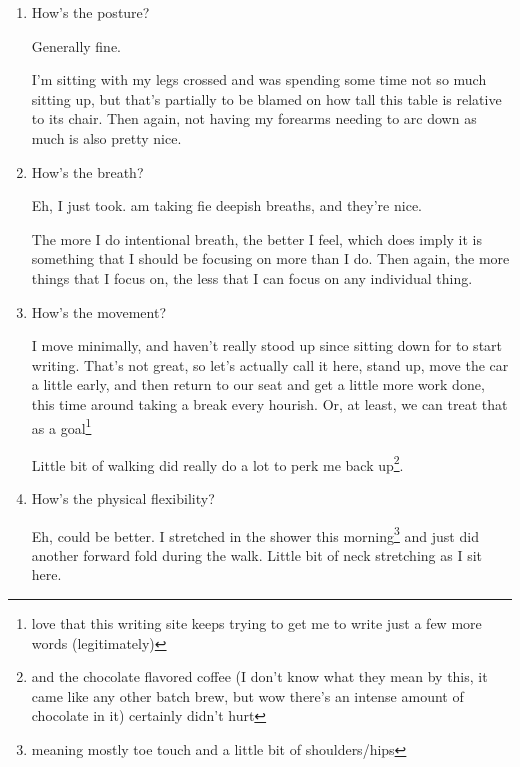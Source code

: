 \documentclass[12pt]{article}
\renewcommand{\,}{\textsuperscript{,}}
\begin{document}
\begin{enumerate}
One of the milks and the yogurt technically got consumed about two hours after the rest of the food, but who's keeping track?\footnote{me, as it turns out}

At the cafe, I've had a raspberry italian soda, but yesterday I got a sweet crepe here and it was delicious. I'm tempted to get another today, and might do on of their savory options.

\item How's the posture?

Generally fine.

I'm sitting with my legs crossed and was spending some time not so much sitting up, but that's partially to be blamed on how tall this table is relative to its chair.  
Then again, not having my forearms needing to arc down as much is also pretty nice.

\item How's the breath?

Eh, I just took. am taking fie deepish breaths, and they're nice.

The more I do intentional breath, the better I feel, which does imply it is something that I should be focusing on more than I do.  
Then again, the more things that I focus on, the less that I can focus on any individual thing.

\item How's the movement?

I move minimally, and haven't really stood up since sitting down for to start writing.  
That's not great, so let's actually call it here, stand up, move the car a little early, and then return to our seat and get a little more work done, this time around taking a break every hourish.  
Or, at least, we can treat that as a goal\footnote{love that this writing site keeps trying to get me to write just a few more words (legitimately)}

Little bit of walking did really do a lot to perk me back up\footnote{and the chocolate flavored coffee (I don't know what they mean by this, it came like any other batch brew, but wow there's an intense amount of chocolate in it) certainly didn't hurt}.

\item How's the physical flexibility?

Eh, could be better.  
I stretched in the shower this morning\footnote{meaning mostly toe touch and a little bit of shoulders/hips} and just did another forward fold during the walk.  
Little bit of neck stretching as I sit here.


\end{enumerate}
\end{document}
